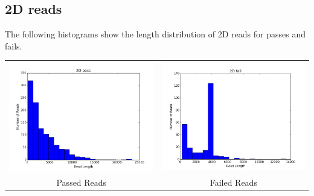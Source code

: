 \subsection*{2D reads}

        The following histograms show the length distribution of 2D reads for passes and fails.

        
        \begin{tabular}{cc}
          \includegraphics[width=.48\textwidth]{2Dpasses}
          &
          \includegraphics[width=.48\textwidth]{2Dfailures}
          \\
          Passed Reads
          &
          Failed Reads
        \end{tabular}
